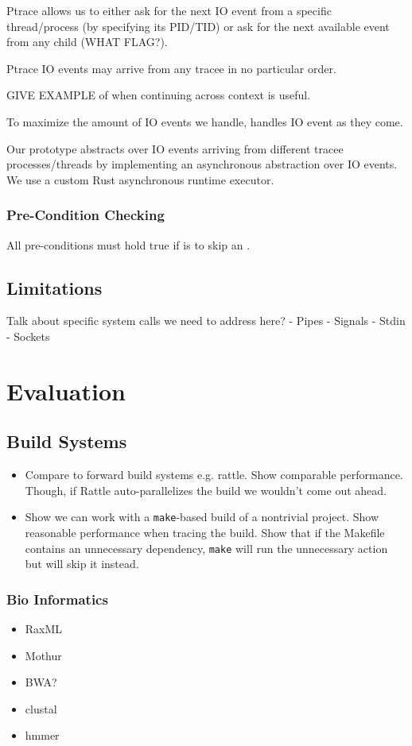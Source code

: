Ptrace allows us to either ask for the next IO event from a specific thread/process (by specifying its PID/TID) or ask for the next available event from any child (WHAT FLAG?).


Ptrace IO events may arrive from any tracee in no particular order. 

GIVE EXAMPLE of when continuing across context is useful.

To maximize the amount of IO events we handle, \pc handles IO event as they come.

Our prototype abstracts over IO events arriving from different tracee processes/threads by implementing an
asynchronous abstraction over IO events. We use a custom Rust asynchronous runtime executor.

\subsubsection{Pre-Condition Checking}
\label{sec:pre-condition-checking}
All pre-conditions must hold true if \pc is to skip an \cacheunit{}. \pc 

\subsection{Limitations}
Talk about specific system calls we need to address here?
- Pipes
- Signals
- Stdin
- Sockets

\section{Evaluation}

\subsection{Build Systems}

\begin{itemize}
\item Compare to forward build systems e.g. rattle. Show comparable performance. Though, if Rattle auto-parallelizes the build we wouldn't come out ahead.
\item Show we can work with a \texttt{make}-based build of a nontrivial project. Show reasonable performance when tracing the build. Show that if the Makefile contains an unnecessary dependency, \texttt{make} will run the unnecessary action but \pc will skip it instead.
\end{itemize}

\subsubsection{Bio Informatics}
\begin{itemize}
  \item RaxML \cacheunit
  \item Mothur
  \item BWA?
  \item clustal
  \item hmmer
\end{itemize}

